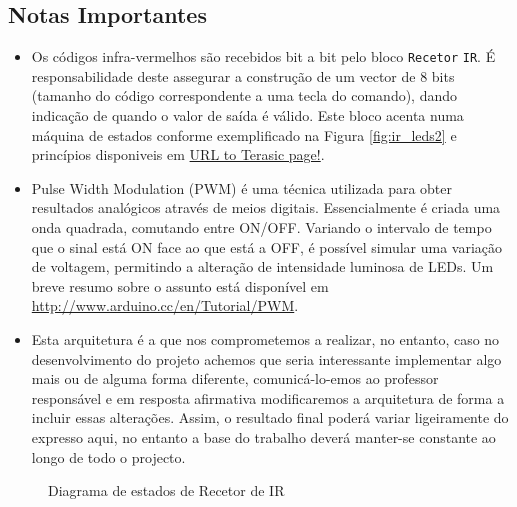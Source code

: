 \documentclass[a4paper,11pt,openright,oneside]{report}
\begin{document}
\subsection{Notas Importantes}

\begin{itemize}
\item Os códigos infra-vermelhos são recebidos bit a bit pelo bloco \verb|Recetor| \verb|IR|. É responsabilidade deste assegurar a construção de um vector de 8 bits (tamanho do código correspondente a uma tecla do comando), dando indicação de quando o valor de saída é válido. Este bloco acenta numa máquina de estados conforme exemplificado na Figura \ref{fig:ir_leds2} e princípios disponiveis em \url{URL to Terasic page!}.
\item Pulse Width Modulation (PWM) é uma técnica utilizada para obter resultados analógicos através de meios digitais. Essencialmente é criada uma onda quadrada, comutando entre ON/OFF. Variando o intervalo de tempo que o sinal está ON face ao que está a OFF, é possível simular uma variação de voltagem, permitindo a alteração de intensidade luminosa de LEDs. Um breve resumo sobre o assunto está disponível em \url{http://www.arduino.cc/en/Tutorial/PWM}.
\item Esta arquitetura é a que nos comprometemos a realizar, no entanto, caso no desenvolvimento do projeto achemos que seria interessante implementar algo mais ou de alguma forma diferente, comunicá-lo-emos ao professor responsável e em resposta afirmativa modificaremos a arquitetura de forma a incluir essas alterações. Assim, o resultado final poderá variar ligeiramente do expresso aqui, no entanto a base do trabalho deverá manter-se constante ao longo de todo o projecto.
\end{itemize}

\begin{figure}[ht]
\center
{}
\caption{Diagrama de estados de Recetor de IR}
\label{fig:ir_leds3}
\end{figure}
\end{document}
